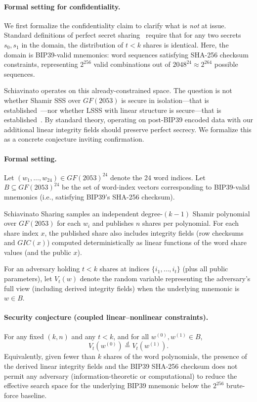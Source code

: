 \documentclass[11pt]{article}
\begin{document}
\paragraph{Formal setting for confidentiality.} We first formalize the confidentiality claim to clarify what is \textit{not} at issue. Standard definitions of perfect secret sharing~\cite{stinson2006,beimel2011} require that for any two secrets $s_0, s_1$ in the domain, the distribution of $t < k$ shares is identical. Here, the domain is BIP39-valid mnemonics: word sequences satisfying SHA-256 checksum constraints, representing $2^{256}$ valid combinations out of $2048^{24} \approx 2^{264}$ possible sequences.

Schiavinato operates on this already-constrained space. The question is not whether Shamir SSS over $GF(2053)$ is secure in isolation—that is established~\cite{shamir1979}—nor whether LSSS with linear structure is secure—that is established~\cite{beimel2011,cramer2000}. By standard theory, operating on post-BIP39 encoded data with our additional linear integrity fields should preserve perfect secrecy. We formalize this as a concrete conjecture inviting confirmation.

\paragraph{Formal setting.}
Let $(w_1,\ldots,w_{24}) \in GF(2053)^{24}$ denote the 24 word indices. Let $B \subseteq GF(2053)^{24}$ be the set of word-index vectors corresponding to BIP39-valid mnemonics (i.e., satisfying BIP39's SHA-256 checksum).

Schiavinato Sharing samples an independent degree-$(k-1)$ Shamir polynomial over $GF(2053)$ for each $w_i$ and publishes $n$ shares per polynomial. For each share index $x$, the published share also includes integrity fields (row checksums and $GIC(x)$) computed deterministically as linear functions of the word share values (and the public $x$).

For an adversary holding $t < k$ shares at indices $\{i_1,\ldots,i_t\}$ (plus all public parameters), let $V_t(w)$ denote the random variable representing the adversary's full view (including derived integrity fields) when the underlying mnemonic is $w \in B$.

\paragraph{Security conjecture (coupled linear--nonlinear constraints).}
For any fixed $(k,n)$ and any $t < k$, and for all $w^{(0)}, w^{(1)} \in B$,
\[
V_t(w^{(0)}) \overset{d}{=} V_t(w^{(1)}).
\]
Equivalently, given fewer than $k$ shares of the word polynomials, the presence of the derived linear integrity fields and the BIP39 SHA-256 checksum does not permit any adversary (information-theoretic or computational) to reduce the effective search space for the underlying BIP39 mnemonic below the $2^{256}$ brute-force baseline.
\end{document}
